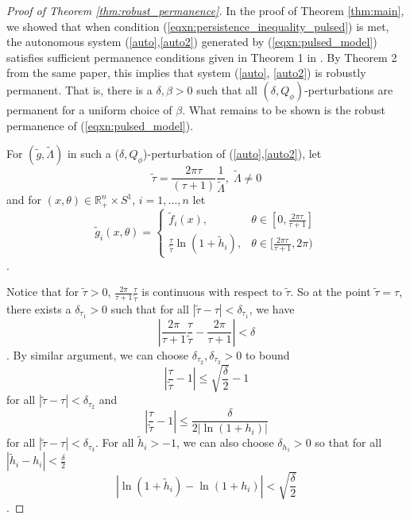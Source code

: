 \documentclass{article}
\theoremstyle{definition}
\newcommand{\R}{{\mathbb{R}}}
\begin{document}
\begin{proof}[Proof of Theorem \ref{thm:robust_permanence}]
In the proof of Theorem \ref{thm:main}, we showed that when condition (\ref{eqxn:persistence_inequality_pulsed}) is met, the autonomous system (\ref{auto},\ref{auto2}) generated by (\ref{eqxn:pulsed_model}) satisfies sufficient permanence conditions given in Theorem 1 in \cite{patel_schreiber_2018}. By Theorem 2 from the same paper, this implies that system (\ref{auto}, \ref{auto2}) is robustly permanent. That is, there is a $\delta , \beta> 0$ such that all $(\delta, Q_\phi)$-perturbations are permanent for a uniform choice of $\beta$. What remains to be shown is the robust permanence of (\ref{eqxn:pulsed_model}). 

For $(\tilde g, \tilde \Lambda)$ in such a ($\delta,Q_\phi$)-perturbation of (\ref{auto},\ref{auto2}), let 
    $$
    \tilde{\tau} = \frac{2\pi \tau}{(\tau + 1)}\frac{1}{\tilde{\Lambda}}, \; \tilde \Lambda \neq 0
    $$ and for $(x, \theta) \in \R^n_+ \times S^1$, $i = 1, \ldots, n$ let
    $$
    \tilde{g}_i(x,\theta) = \begin{cases}
        \tilde{f}_i(x), & \theta \in [0,\frac{2\pi \tau}{\tau + 1}]\\
        \frac{\tau}{\tilde{\tau}} \ln{(1+ \tilde{h}_i)}, & \theta \in [\frac{2\pi\tau}{\tau + 1} , 2\pi)
    \end{cases}
    $$.
    
    Notice that for $\tilde{\tau} > 0$, $\frac{2\pi}{\tau + 1}\frac{\tau}{\tilde \tau}$ is continuous with respect to $\tilde\tau$. So at the point $\tilde \tau = \tau$, there exists a $\delta_{\tau_1} > 0$ such that for all $|\tilde \tau - \tau| < \delta_{\tau_1}$, we have 
    $$
    |\frac{2\pi}{\tau + 1}\frac{\tau}{\tilde{\tau}} - \frac{2\pi}{\tau + 1}| < \delta
    $$. By similar argument, we can choose $\delta_{\tau_2}, \delta_{\tau_3}>0$ to bound 
    $$
    |\frac{\tau}{\tilde{\tau}} - 1| \leq \sqrt{\frac{\delta}{2}} -1
    $$
    for all $|\tilde{\tau} - \tau| < \delta_{\tau_2}$ and 
    $$
    |\frac{\tau}{\tilde{\tau}} - 1| \leq \frac{\delta}{2|\ln(1+h_i)|}
    $$
    for all $|\tilde{\tau} - \tau| < \delta_{\tau_3}$. For all $\tilde{h}_i > -1$, we can also choose $\delta_{h_1} > 0$ so that for all $|\tilde{h}_i -h_i| < \frac{\delta}{2}$
    $$
    |\ln{(1+\tilde{h}_i)} - \ln{(1+h_i)}| < \sqrt{\frac{\delta}{2}} 
    $$.


\end{proof}
\end{document}
